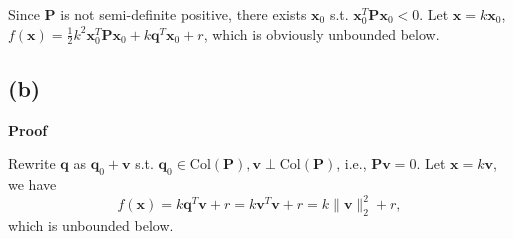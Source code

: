 \documentclass[12pt]{article}
\begin{document}
Since $\bm{P}$ is not semi-definite positive, there exists $\bm{x}_0$ s.t. $\bm{x}_0^T\bm{P}\bm{x}_0<0$. Let $\bm{x}=k\bm{x}_0$, $f(\bm{x})=\frac{1}{2}k^2\bm{x}_0^T\bm{P}\bm{x}_0+k\bm{q}^T\bm{x}_0+r$, which is obviously unbounded below.

\subsection*{(b)}
\textbf{Proof}

Rewrite $\bm{q}$ as $\bm{q}_0+\bm{v}$ s.t. $\bm{q}_0\in\text{Col}(\bm{P}),\bm{v}\perp\text{Col}(\bm{P})$, i.e., $\bm{P}\bm{v}=0$. Let $\bm{x}=k\bm{v}$, we have $$f(\bm{x})=k\bm{q}^T\bm{v}+r=k\bm{v}^T\bm{v}+r=k\|\bm{v}\|_2^2+r,$$ which is unbounded below.
\end{document}
